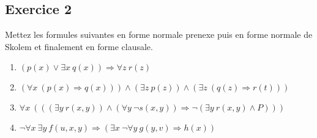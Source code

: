 \subsection*{Exercice 2}
Mettez les formules suivantes en forme normale prenexe puis en forme normale de Skolem et finalement en forme clausale. 
\begin{enumerate}
\item $(p(x) \vee \exists x \ q(x)) \Rightarrow \forall z \ r(z)$
\item $(\forall x \ (p(x) \Rightarrow q(x))) \wedge (\exists z \ p(z)) \wedge (\exists z \ (q(z) \Rightarrow r(t)))$
\item $\forall x \ ( ((\exists y \ r(x, y)) \wedge (\forall y \  \neg s(x, y)) \Rightarrow \neg (\exists y \ r(x, y) \wedge P)) )$
\item $\neg \forall x \ \exists y \ f(u, x, y) \Rightarrow (\exists x \ \neg \forall y \ g(y, v) \Rightarrow h(x))$
\end{enumerate}

